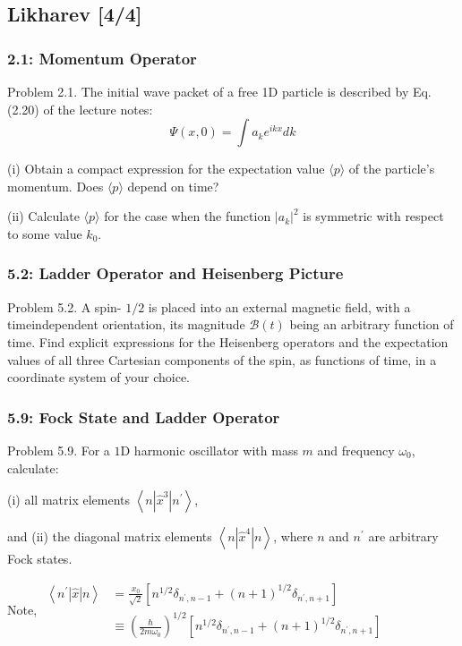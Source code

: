 \documentclass[11pt]{article}
\begin{document}
\subsection{Likharev [4/4]}
\label{sec:orge676ce4}
\subsubsection{2.1: Momentum Operator}
\label{sec:org6e2abf4}
Problem 2.1. The initial wave packet of a free 1D particle is described by Eq. (2.20) of the lecture notes:
$$
\Psi(x, 0)=\int a_k e^{i k x} d k
$$

(i) Obtain a compact expression for the expectation value \(\langle p\rangle\) of the
particle's momentum. Does \(\langle p\rangle\) depend on time?

(ii) Calculate \(\langle p\rangle\) for the case when the function \(\left|a_k\right|^2\) is
symmetric with respect to some value \(k_0\).
\subsubsection{5.2: Ladder Operator and Heisenberg Picture}
\label{sec:orgf0efb7c}
Problem 5.2. A spin- \(1 / 2\) is placed into an external magnetic field, with a
timeindependent orientation, its magnitude \(\mathscr{B}(t)\) being an arbitrary
function of time. Find explicit expressions for the Heisenberg operators and the
expectation values of all three Cartesian components of the spin, as functions
of time, in a coordinate system of your choice.
\subsubsection{5.9: Fock State and Ladder Operator}
\label{sec:org337f076}
Problem 5.9. For a \(1 \mathrm{D}\) harmonic oscillator with mass \(m\) and
frequency \(\omega_0\), calculate:

(i) all matrix elements \(\left\langle n\left|\hat{x}^3\right| n^{\prime}\right\rangle\),

and (ii) the diagonal matrix elements \(\left\langle n\left|\hat{x}^4\right| n\right\rangle\),
where \(n\) and \(n^{\prime}\) are arbitrary Fock states.


Note, \(\begin{aligned} \left\langle n^{\prime}|\hat{x}| n\right\rangle &
=\frac{x_0}{\sqrt{2}}\left[n^{1 / 2} \delta_{n^{\prime}, n-1}+(n+1)^{1 / 2} \delta_{n^{\prime},
n+1}\right] \\ & \equiv\left(\frac{\hbar}{2 m \omega_0}\right)^{1 / 2}\left[n^{1 / 2}
\delta_{n^{\prime}, n-1}+(n+1)^{1 / 2} \delta_{n^{\prime}, n+1}\right] \end{aligned}\)
\end{document}
